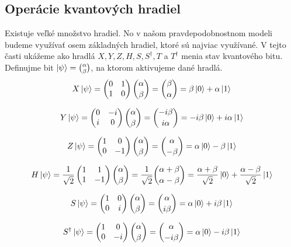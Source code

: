 \subsection{Operácie kvantových hradiel}
\label{op_kvan_hradiel}
Existuje veľké množstvo hradiel. No v našom pravdepodobnostnom modeli budeme
využívať osem základných hradiel, ktoré sú najviac využívané. V tejto časti
ukážeme ako hradlá \(X, Y, Z, H, S, S^{\dag}, T\) a \(T^{\dag}\) menia stav
kvantového bitu. Definujme bit \(\ket{\psi} = \binom{\alpha}{\beta}\), na 
ktorom aktivujeme dané hradlá.
\[X\ket{\psi} = 
\begin{pmatrix}
0 & 1 \\
1 & 0 \\
\end{pmatrix}\binom{\alpha}{\beta} = \binom{\beta}{\alpha} = \beta\ket{0} + \alpha\ket{1}\]

\[Y\ket{\psi} = 
\begin{pmatrix}
0 & -i \\
i & 0 \\
\end{pmatrix}\binom{\alpha}{\beta} = \binom{-i\beta}{i\alpha} = -i\beta\ket{0} + i\alpha\ket{1}\]

\[Z\ket{\psi} = 
\begin{pmatrix}
1 & 0 \\
0 & -1 \\
\end{pmatrix}\binom{\alpha}{\beta} = \binom{\alpha}{-\beta} = \alpha\ket{0} - \beta\ket{1}\]

\[H\ket{\psi} = \frac{1}{\sqrt{2}}
\begin{pmatrix}
1 & 1 \\
1 & -1 \\
\end{pmatrix}\binom{\alpha}{\beta} = \frac{1}{\sqrt{2}}\binom{\alpha + \beta}{\alpha - \beta} = \frac{\alpha + \beta}{\sqrt{2}}\ket{0} + \frac{\alpha - \beta}{\sqrt{2}}\ket{1}\]

\[S\ket{\psi} = 
\begin{pmatrix}
1 & 0 \\
0 & i \\
\end{pmatrix}\binom{\alpha}{\beta} = \binom{\alpha}{i\beta} = \alpha\ket{0} + i\beta\ket{1}\]

\[S^{\dag}\ket{\psi} = 
\begin{pmatrix}
1 & 0 \\
0 & -i \\
\end{pmatrix}\binom{\alpha}{\beta} = \binom{\alpha}{-i\beta} = \alpha\ket{0} - i\beta\ket{1}\]

